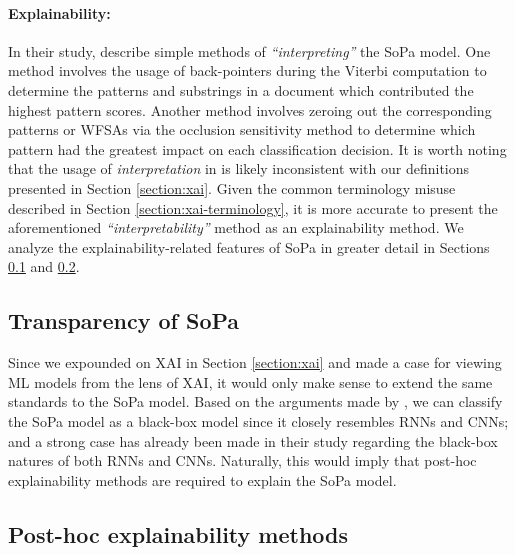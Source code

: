 \paragraph{Explainability:} In their study, \citet{schwartz2018sopa} describe simple methods of \textit{``interpreting''} the SoPa model. One method involves the usage of back-pointers during the Viterbi computation to determine the patterns and substrings in a document which contributed the highest pattern scores. Another method involves zeroing out the corresponding patterns or WFSAs via the occlusion sensitivity method to determine which pattern had the greatest impact on each classification decision. It is worth noting that the usage of \textit{interpretation} in \citet{schwartz2018sopa} is likely inconsistent with our definitions presented in Section \ref{section:xai}. Given the common terminology misuse described in Section \ref{section:xai-terminology}, it is more accurate to present the aforementioned \textit{``interpretability''} method as an explainability method. We analyze the explainability-related features of SoPa in greater detail in Sections \ref{section:sopa-transparency} and \ref{section:sopa-explainability}. 

\subsection{Transparency of SoPa}

\label{section:sopa-transparency}

Since we expounded on XAI in Section \ref{section:xai} and made a case for viewing ML models from the lens of XAI, it would only make sense to extend the same standards to the SoPa model. Based on the arguments made by \citet{arrieta2020explainable}, we can classify the SoPa model as a black-box model since it closely resembles RNNs and CNNs; and a strong case has already been made in their study regarding the black-box natures of both RNNs and CNNs. Naturally, this would imply that post-hoc explainability methods are required to explain the SoPa model. 

\subsection{Post-hoc explainability methods}

\label{section:sopa-explainability}

